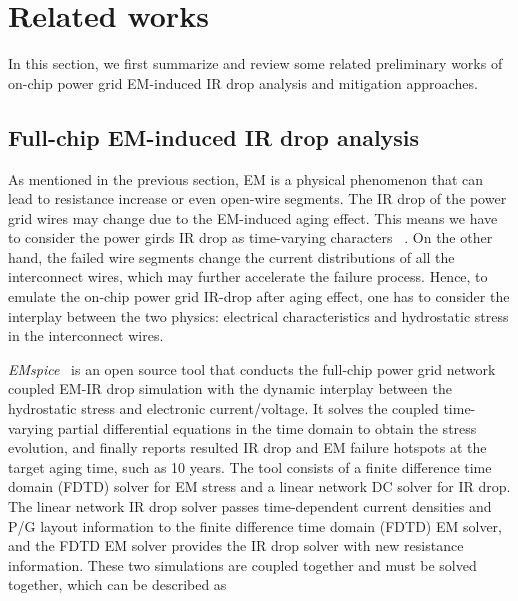 \section{Related works}
\label{sec:related}

In this section, we first summarize and review some related preliminary works of on-chip power grid EM-induced IR drop analysis and mitigation approaches.

\subsection{Full-chip EM-induced IR drop analysis}
\label{subsec:emspice}
As mentioned in the previous section, EM is a physical phenomenon that can lead to resistance increase or even open-wire segments.  The IR drop of the power grid wires may change due to the EM-induced aging effect. This means we have to consider the power girds IR drop as time-varying characters ~\cite{SunYu:TDMR'20, Huang:TCAD'15, Chatterjee:2018TCAD,SukharevNajm:2018TDMR}. 
On the other hand, the failed wire segments change the current distributions of all the interconnect wires, which may further accelerate the failure process. Hence, to emulate the on-chip power grid IR-drop after aging effect, one has to consider the interplay between the two physics: electrical characteristics and hydrostatic stress in the interconnect wires.

{\it EMspice}~\cite{SunYu:TDMR'20,EMspiceSourceCode} is an open source tool that conducts the full-chip power grid network coupled EM-IR drop simulation with the dynamic interplay between the hydrostatic stress and electronic current/voltage. It solves the coupled time-varying partial differential equations in the time domain to obtain the stress evolution, and finally reports resulted IR drop and EM failure hotspots at the target aging time, such as 10 years.  The tool consists of a finite difference time domain (FDTD) solver for EM stress and a linear network DC solver for IR drop. The linear network IR drop solver passes time-dependent current densities and P/G layout information to the finite difference time domain (FDTD) EM solver, and the FDTD EM solver provides the IR drop solver with new resistance information. These two simulations are coupled together and must be solved together, which can be described as


